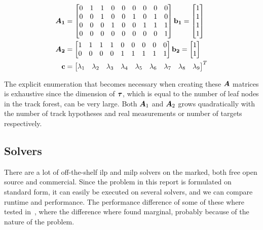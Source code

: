 \begin{equation}
\begin{split}
\bm{A_1} &=\begin{bmatrix}
		0 & 1 & 1 & 0 & 0 & 0 & 0 & 0 & 0 \\
       	0 & 0 & 1 & 0 & 0 & 1 & 0 & 1 & 0 \\
       	0 & 0 & 0 & 1 & 0 & 0 & 1 & 1 & 1 \\
       	0 & 0 & 0 & 0 & 0 & 0 & 0 & 0 & 1 \\
     	\end{bmatrix}
\boldsymbol{\mathbf{b_1}} = 	\begin{bmatrix}
			1 \\ 1  \\ 1 \\ 1
			\end{bmatrix} \\
\bm{A_2} &=\begin{bmatrix}
		1 & 1 & 1 & 1 & 0 & 0 & 0 & 0 & 0 \\
       	0 & 0 & 0 & 0 & 1 & 1 & 1 & 1 & 1 \\
     	\end{bmatrix} 
\boldsymbol{\mathbf{b_2}} = 	\begin{bmatrix}
			1 \\ 1
			\end{bmatrix} \\
\boldsymbol{\mathbf{c}} &=\begin{bmatrix}
		\lambda_1 & \lambda_2 & \lambda_3 & \lambda_4 & \lambda_5 & \lambda_6 & \lambda_7 & \lambda_8 & \lambda_9
		\end{bmatrix}^T \\
\end{split}
\label{eq:example_matrices}
\end{equation}

The explicit enumeration that becomes necessary when creating these $\bm{A}$ matrices is exhaustive since the dimension of $\boldsymbol{\mathbf{\tau}}$, which is equal to the number of leaf nodes in the track forest, can be very large. Both $\bm{A}_1$ and $\bm{A}_2$ grows quadratically with the number of track hypotheses and real measurements or number of targets respectively.

\subsection{Solvers}
There are a lot of off-the-shelf \gls{ilp} and \gls{milp} solvers on the marked, both free open source and commercial. Since the problem in this report is formulated on standard form, it can easily be executed on several solvers, and we can compare runtime and performance. The performance difference of some of these where tested in~\cite{Liland_2017}, where the difference where found marginal, probably because of the nature of the problem. %


